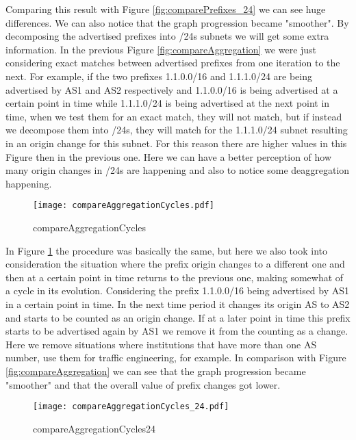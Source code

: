 \documentclass[11pt,a4paper]{scrreprt}
\begin{document}
Comparing this result with Figure \ref{fig:comparePrefixes_24} we can see huge differences. We can also notice that the graph progression became "smoother". By decomposing the advertised prefixes into /24s subnets we will get some extra information. In the previous Figure \ref{fig:compareAggregation} we were just considering exact matches between advertised prefixes from one iteration to the next. For example, if the two prefixes 1.1.0.0/16 and 1.1.1.0/24 are being advertised by AS1 and AS2 respectively and 1.1.0.0/16 is being advertised at a certain point in time while 1.1.1.0/24 is being advertised at the next point in time, when we test them for an exact match, they will not match, but if instead we decompose them into /24s, they will match for the 1.1.1.0/24 subnet resulting in an origin change for this subnet. For this reason there are higher values in this Figure then in the previous one. Here we can have a better perception of how many origin changes in /24s are happening and also to notice some deaggregation happening.  



\begin{figure}[ht!]
\centering
\texttt{[image: compareAggregationCycles.pdf]}
\caption{compareAggregationCycles}
\label{fig:compareAggregationCycles}
\end{figure}

In Figure \ref{fig:compareAggregationCycles} the procedure was basically the same, but here we also took into consideration the situation where the prefix origin changes to a different one and then at a certain point in time returns to the previous one, making somewhat of a cycle in its evolution. Considering the prefix 1.1.0.0/16 being advertised by AS1 in a certain point in time. In the next time period it changes its origin AS to AS2 and starts to be counted as an origin change. If at a later point in time this prefix starts to be advertised again by AS1 we remove it from the counting as a change. Here we remove situations where institutions that have more than one AS number, use them for traffic engineering, for example.  In comparison with Figure \ref{fig:compareAggregation} we can see that the graph progression became "smoother" and that the overall value of prefix changes got lower.

\begin{figure}[ht!]
\centering
\texttt{[image: compareAggregationCycles\_24.pdf]}
\caption{compareAggregationCycles24}
\label{fig:compareAggregationCycles24}
\end{figure}
\end{document}
